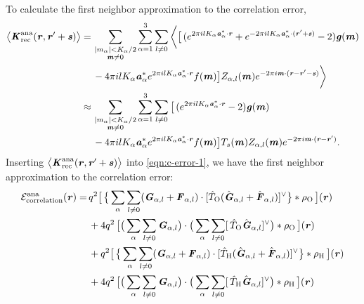 \documentclass[journal=jacsat,manuscript=article]{achemso}
\renewcommand{\v}[1]{\textbf{\textit{#1}}}
\begin{document}
To calculate the first neighbor approximation to the correlation error, 
\begin{align}\nonumber
  \big\langle
  \v K^{\textrm{ana}}_{\textrm{rec}}(\v r, \v r' + \v s)
  \big\rangle
  =\,&
  \sum_{
    \begin{subarray}{c}
      \vert m_{\alpha}\vert < K_\alpha/2\\
      \v m\neq 0
    \end{subarray}}
  \sum_{\alpha=1}^3\sum_{l\neq 0}
  \bigg\langle
  \big[
  \,(
  e^{2\pi i l K_\alpha\v a^\ast_\alpha\cdot \v r} +
  e^{-2\pi i l K_\alpha\v a^\ast_\alpha\cdot (\v r' + \v s)}
  - 2
  )
  \v g(\v m)
  \\\nonumber
  \,&
  - 4\pi i l K_\alpha\v a_\alpha^\ast e^{2\pi i l K_\alpha\v a^\ast_\alpha\cdot \v r}
  f(\v m)
  \big]
  Z_{\alpha,l}(\v m)
  e^{-2\pi i\v m\cdot(\v r-\v r' - \v s)}
  \bigg\rangle \\\nonumber
  \approx\,&
  \sum_{
    \begin{subarray}{c}
      \vert m_{\alpha}\vert < K_\alpha/2\\
      \v m\neq 0
    \end{subarray}}
  \sum_{\alpha=1}^3\sum_{l\neq 0}
  \big[
  \,(
  e^{2\pi i l K_\alpha\v a^\ast_\alpha\cdot \v r} 
  - 2
  )
  \v g(\v m)
  \\
  \,&
  - 4\pi i l K_\alpha\v a_\alpha^\ast e^{2\pi i l K_\alpha\v a^\ast_\alpha\cdot \v r}
  f(\v m)
  \big] T_s(\v m)
  Z_{\alpha,l}(\v m)
  e^{-2\pi i\v m\cdot(\v r-\v r')}.
\end{align}
Inserting
$\big\langle
\v K^{\textrm{ana}}_{\textrm{rec}}(\v r, \v r' + \v s)
\big\rangle$
into \ref{eqn:c-error-1}, we have the first neighbor approximation to the
correlation error:
\begin{align}\nonumber
  \mathcal E^{\textrm{ana}}_{\textrm{correlation}}(\v r)
  =\,&
  q^2
  \big[\,
  \big\{
  \sum_{\alpha} \sum_{l\neq 0}
  (\v G_{\alpha,l}+\v F_{\alpha,l})\cdot
  [\hat T_{\textrm{O}} (\hat{\v G}_{\alpha,l}+\hat{\v F}_{\alpha,l})]^{\vee}
  \big\}
  \ast \rho_{\textrm{O}}
  \,\big] (\v r) \\\nonumber
  \,&+
  4q^2\,
  \big[
  \big(
  \sum_{\alpha} \sum_{l\neq 0}  
  \v G_{\alpha,l}
  \big)
  \cdot
  \big(
  \sum_{\alpha} \sum_{l\neq 0}  
  [\,\hat T_{\textrm{O}}\hat{\v G}_{\alpha,l}]^{\vee}
  \big)
  \ast \rho_{\textrm{O}}\,
  \big] (\v r) \\\nonumber
  \,&+
  q^2
  \big[\,
  \big\{
  \sum_{\alpha} \sum_{l\neq 0}
  (\v G_{\alpha,l}+\v F_{\alpha,l})\cdot
  [\hat T_{\textrm{H}} (\hat{\v G}_{\alpha,l}+\hat{\v F}_{\alpha,l})]^{\vee}
  \big\}
  \ast \rho_{\textrm{H}}
  \,\big] (\v r) \\
  \,&+
  4q^2\,
  \big[
  \big(
  \sum_{\alpha} \sum_{l\neq 0}  
  \v G_{\alpha,l}
  \big)
  \cdot
  \big(
  \sum_{\alpha} \sum_{l\neq 0}  
  [\,\hat T_{\textrm{H}}\hat{\v G}_{\alpha,l}]^{\vee}
  \big)
  \ast \rho_{\textrm{H}}\,
  \big] (\v r) 
\end{align}




{}
% 
\end{document}
